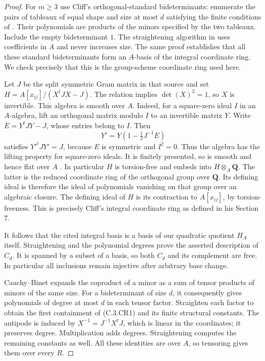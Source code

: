 \begin{proof}
For $m\geq3$ use Cliff's orthogonal-standard bideterminants:
enumerate the pairs of tableaux of equal shape and size
at most $d$ satisfying the finite conditions of
\cite[Section 2, pp.\ 2--3]{C-CliffIntegralBasis2008}.
Their polynomials are products of the minors specified by
the two tableaux. Include the empty bideterminant $1$.
The straightening algorithm in
\cite[Theorem 5.1, p.\ 17; Section 7, proof of Theorem 7.1,
pp.\ 22--23]{C-CliffIntegralBasis2008}
uses coefficients in $A$ and never increases size.
The same proof establishes that all these standard
bideterminants form an $A$-basis of the integral coordinate
ring. We check precisely that this is the group-scheme
coordinate ring used here.

Let $J$ be the split symmetric Gram matrix in that source
and set $H=A[x_{ij}]/(X^tJX-J)$.
The relation implies $\det(X)^2=1$, so $X$ is invertible.
This algebra is smooth over $A$. Indeed, for a square-zero
ideal $I$ in an $A$-algebra, lift an orthogonal matrix
modulo $I$ to an invertible matrix $Y$. Write
$E=Y^tJY-J$, whose entries belong to $I$. Then
\[
                 Y'=Y(1-\tfrac12J^{-1}E)
\]
satisfies $Y'^tJY'=J$, because $E$ is symmetric and $I^2=0$.
Thus the algebra has the lifting property for square-zero
ideals. It is finitely presented, so is smooth and hence
flat over $A$
\cite[Proposition 10.138.13, Tag 00TN; Lemma 10.137.9,
Tag 00TA]{C-StacksCompleteCoefficients}.
In particular $H$ is torsion-free and embeds into $H\otimes_A
\mathbf Q$. The latter is the reduced coordinate ring
of the orthogonal group over $\mathbf Q$.
Its defining ideal is therefore the ideal of polynomials
vanishing on that group over an algebraic closure.
The defining ideal of $H$ is its contraction to $A[x_{ij}]$,
by torsion-freeness. This is precisely Cliff's integral
coordinate ring as defined in his Section 7.

It follows that the cited integral basis is a basis of
our quadratic quotient $H_A$ itself. Straightening and
the polynomial degrees prove the asserted description
of $C_d$. It is spanned by a subset of a basis, so both
$C_d$ and its complement are free. In particular all
inclusions remain injective after arbitrary base change.

Cauchy--Binet expands the coproduct of a minor as a sum
of tensor products of minors of the same size. For a
bideterminant of size $d$, it consequently gives
polynomials of degree at most $d$ in each tensor factor.
Straighten each factor to obtain the first containment
of (C.3.CR1) and its finite structural constants.
The antipode is induced by $X^{-1}=J^{-1}X^tJ$,
which is linear in the coordinates; it preserves degree.
Multiplication adds degrees. Straightening computes
the remaining constants as well. All these identities
are over $A$, so tensoring gives them over every $R$.


\end{proof}
